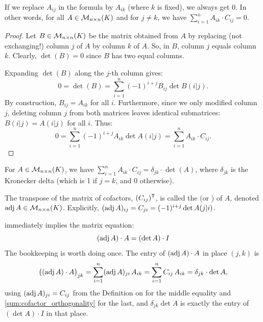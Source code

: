 \begin{lemma*}\label{lem:false_cofactor}
  If we replace $A_{ij}$ in the formula by $A_{ik}$ (where $k$ is fixed), we always get $0$. In other words, for all $A \in \mathcal{M}_{n \times n}(K)$ and for $j \neq k$, we have $\sum_{i=1}^n A_{ik} \cdot C_{ij} = 0$.
\end{lemma*}

\begin{proof}
  Let $B \in \mathcal{M}_{n \times n}(K)$ be the matrix obtained from $A$ by replacing (not exchanging!) column $j$ of $A$ by column $k$ of $A$. So, in $B$, column $j$ equals column $k$. Clearly, $\det(B) = 0$ since $B$ has two equal columns.

  Expanding $\det(B)$ along the $j$-th column gives:
  \[
  0 = \det(B) = \sum_{i=1}^n (-1)^{i+j} B_{ij} \det B(i|j).
  \]
  By construction, $B_{ij} = A_{ik}$ for all $i$. Furthermore, since we only modified column $j$, deleting column $j$ from both matrices leaves identical submatrices: $B(i|j) = A(i|j)$ for all $i$. Thus:
  \[
  0 = \sum_{i=1}^n (-1)^{i+j} A_{ik} \det A(i|j) = \sum_{i=1}^n A_{ik} \cdot C_{ij}.
  \]
\end{proof}

\begin{summary}
\label{sum:cofactor_orthogonality}
For $A \in \mathcal{M}_{n \times n}(K)$, we have $\sum_{i=1}^n A_{ik} \cdot C_{ij} = \delta_{jk} \cdot \det(A)$, where $\delta_{jk}$ is the Kronecker delta (which is 1 if $j=k$, and 0 otherwise).
\end{summary}

\begin{definition*}\label{def:classical_adjoint}
  The transpose of the matrix of cofactors, $(C_{ij})^{\mathsf{T}}$, is called the  (or ) of $A$, denoted $\operatorname{adj} A \in \mathcal{M}_{n \times n}(K)$. Explicitly, $(\operatorname{adj} A)_{ij} = C_{ji} = (-1)^{i+j} \det A(j|i)$.
\end{definition*}

 immediately implies the matrix equation:
\begin{equation} \label{eq:adj_property_right}
  (\operatorname{adj} A) \cdot A = (\det A) \cdot I
\end{equation}
The bookkeeping is worth doing once. The entry of $(\operatorname{adj} A) \cdot A$ in place $(j,k)$ is
\[
\big( (\operatorname{adj} A) \cdot A \big)_{jk} = \sum_{i=1}^{n} (\operatorname{adj} A)_{ji} \, A_{ik} = \sum_{i=1}^{n} C_{ij} \, A_{ik} = \delta_{jk} \cdot \det A,
\]
using $(\operatorname{adj} A)_{ji} = C_{ij}$ from the Definition on  for the middle equality and \cref{sum:cofactor_orthogonality} for the last, and $\delta_{jk} \det A$ is exactly the entry of $(\det A) \cdot I$ in that place.

